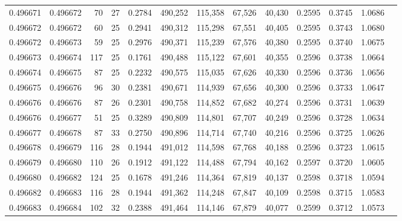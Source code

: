 \begin{tabular}{rrrrrrrrrrrrr}
0.496671 & 0.496672 &  70 &  27 &                                     0.2784 & 490,252 & 115,358 &  67,526 &  40,430 & 0.2595 & 0.3745 & 1.0686 \\
0.496672 & 0.496672 &  60 &  25 &                                     0.2941 & 490,312 & 115,298 &  67,551 &  40,405 & 0.2595 & 0.3743 & 1.0680 \\
0.496672 & 0.496673 &  59 &  25 &                                     0.2976 & 490,371 & 115,239 &  67,576 &  40,380 & 0.2595 & 0.3740 & 1.0675 \\
0.496673 & 0.496674 & 117 &  25 &                                     0.1761 & 490,488 & 115,122 &  67,601 &  40,355 & 0.2596 & 0.3738 & 1.0664 \\
0.496674 & 0.496675 &  87 &  25 &                                     0.2232 & 490,575 & 115,035 &  67,626 &  40,330 & 0.2596 & 0.3736 & 1.0656 \\
0.496675 & 0.496676 &  96 &  30 &                                     0.2381 & 490,671 & 114,939 &  67,656 &  40,300 & 0.2596 & 0.3733 & 1.0647 \\
0.496676 & 0.496676 &  87 &  26 &                                     0.2301 & 490,758 & 114,852 &  67,682 &  40,274 & 0.2596 & 0.3731 & 1.0639 \\
0.496676 & 0.496677 &  51 &  25 &                                     0.3289 & 490,809 & 114,801 &  67,707 &  40,249 & 0.2596 & 0.3728 & 1.0634 \\
0.496677 & 0.496678 &  87 &  33 &                                     0.2750 & 490,896 & 114,714 &  67,740 &  40,216 & 0.2596 & 0.3725 & 1.0626 \\
0.496678 & 0.496679 & 116 &  28 &                                     0.1944 & 491,012 & 114,598 &  67,768 &  40,188 & 0.2596 & 0.3723 & 1.0615 \\
0.496679 & 0.496680 & 110 &  26 &                                     0.1912 & 491,122 & 114,488 &  67,794 &  40,162 & 0.2597 & 0.3720 & 1.0605 \\
0.496680 & 0.496682 & 124 &  25 &                                     0.1678 & 491,246 & 114,364 &  67,819 &  40,137 & 0.2598 & 0.3718 & 1.0594 \\
0.496682 & 0.496683 & 116 &  28 &                                     0.1944 & 491,362 & 114,248 &  67,847 &  40,109 & 0.2598 & 0.3715 & 1.0583 \\
0.496683 & 0.496684 & 102 &  32 &                                     0.2388 & 491,464 & 114,146 &  67,879 &  40,077 & 0.2599 & 0.3712 & 1.0573 \\

\end{tabular}
